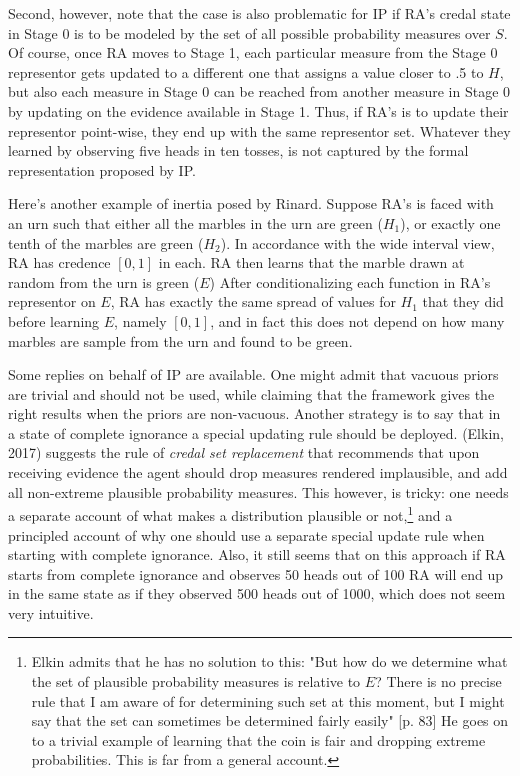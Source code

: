 \documentclass[
  10pt,
  dvipsnames,enabledeprecatedfontcommands]{scrartcl}
\begin{document}
Second, however, note that the case is also problematic for IP if RA's
credal state in Stage 0 is to be modeled by the set of all possible
probability measures over \(S\). Of course, once RA moves to Stage 1,
each particular measure from the Stage 0 representor gets updated to a
different one that assigns a value closer to .5 to \(H\), but also each
measure in Stage 0 can be reached from another measure in Stage 0 by
updating on the evidence available in Stage 1. Thus, if RA's is to
update their representor point-wise, they end up with the same
representor set. Whatever they learned by observing five heads in ten
tosses, is not captured by the formal representation proposed by IP.

Here's another example of inertia posed by Rinard. Suppose RA's is faced
with an urn such that either all the marbles in the urn are green
(\(H_1\)), or exactly one tenth of the marbles are green (\(H_2\)). In
accordance with the wide interval view, RA has credence \([0,1]\) in
each. RA then learns that the marble drawn at random from the urn is
green (\(E\)) After conditionalizing each function in RA's representor
on \(E\), RA has exactly the same spread of values for \(H_1\) that they
did before learning \(E\), namely \([0,1]\), and in fact this does not
depend on how many marbles are sample from the urn and found to be
green.

Some replies on behalf of IP are available. One might admit that vacuous
priors are trivial and should not be used, while claiming that the
framework gives the right results when the priors are non-vacuous.
Another strategy is to say that in a state of complete ignorance a
special updating rule should be deployed. (Elkin, 2017) suggests the
rule of \emph{credal set replacement} that recommends that upon
receiving evidence the agent should drop measures rendered implausible,
and add all non-extreme plausible probability measures. This however, is
tricky: one needs a separate account of what makes a distribution
plausible or
not,\footnote{Elkin admits that he has no solution to this: "But how do we determine what the set of plausible probability measures is relative to $E$? There is no precise rule that I am aware of for determining such set at this moment, but I might say that the set can sometimes be determined fairly easily" [p. 83] He goes on to a trivial example of learning that the coin is fair and dropping extreme probabilities. This is far from a general account.}
and a principled account of why one should use a separate special update
rule when starting with complete ignorance. Also, it still seems that on
this approach if RA starts from complete ignorance and observes 50 heads
out of 100 RA will end up in the same state as if they observed 500
heads out of 1000, which does not seem very intuitive.
\end{document}
